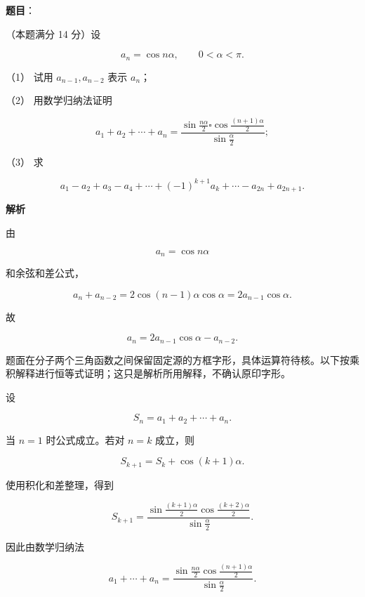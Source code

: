 \begin{answer}

\textbf{题目}：

（本题满分 14 分）设

\nopagebreak[4]
\[
a_n=\cos n\alpha,\qquad 0<\alpha<\pi.
\]

（1） 试用 $a_{n-1},a_{n-2}$ 表示 $a_n$；

（2） 用数学归纳法证明

\nopagebreak[4]
\[
a_1+a_2+\cdots+a_n
=\frac{\sin\frac{n\alpha}{2}\square\cos\frac{(n+1)\alpha}{2}}
{\sin\frac\alpha2};
\]

（3） 求

\nopagebreak[4]
\[
a_1-a_2+a_3-a_4+\cdots+(-1)^{k+1}a_k+\cdots-a_{2n}+a_{2n+1}.
\]

\textbf{解析}


由

\nopagebreak[4]
\[
a_n=\cos n\alpha
\]

和余弦和差公式，

\nopagebreak[4]
\[
a_n+a_{n-2}
=2\cos(n-1)\alpha\cos\alpha
=2a_{n-1}\cos\alpha.
\]

故

\nopagebreak[4]
\[
a_n=2a_{n-1}\cos\alpha-a_{n-2}.
\]


题面在分子两个三角函数之间保留固定源的方框字形，具体运算符待核。以下按乘积解释进行恒等式证明；这只是解析所用解释，不确认原印字形。

设

\nopagebreak[4]
\[
S_n=a_1+a_2+\cdots+a_n.
\]

当 $n=1$ 时公式成立。若对 $n=k$ 成立，则

\nopagebreak[4]
\[
S_{k+1}=S_k+\cos(k+1)\alpha.
\]

使用积化和差整理，得到

\nopagebreak[4]
\[
S_{k+1}
=\frac{\sin\frac{(k+1)\alpha}{2}
\cos\frac{(k+2)\alpha}{2}}
{\sin\frac\alpha2}.
\]

因此由数学归纳法

\nopagebreak[4]
\[
a_1+\cdots+a_n
=\frac{\sin\frac{n\alpha}{2}
\cos\frac{(n+1)\alpha}{2}}
{\sin\frac\alpha2}.
\]


\end{answer}

